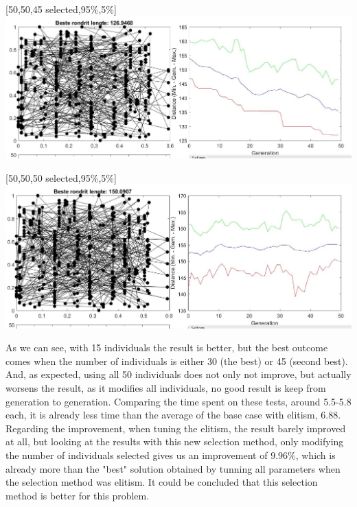 \begin{center}
[50,50,45 selected,95\%,5\%]\\
\includegraphics[width=15cm]{img/optional/optional_4.jpg}
\end{center}

\begin{center}
[50,50,50 selected,95\%,5\%]\\
\includegraphics[width=15cm]{img/optional/optional_5.jpg}
\end{center}

As we can see, with 15 individuals the result is better, but the best outcome
comes when the number of individuals is either 30 (the best) or 45 (second
best). And, as expected, using all 50 individuals does not only not improve,
but actually worsens the result, as it modifies all individuals, no good
result is keep from generation to generation. Comparing the time spent on these
tests, around 5.5-5.8 each, it is already less time than the average of the base
case with elitism, 6.88. 
Regarding the improvement, when tuning the elitism, the result barely improved
at all, but looking at the results with this new selection method, only
modifying the number of individuals selected gives us an improvement of 9.96\%,
which is already more than the "best" solution obtained by tunning all
parameters when the selection method was elitism. It could be concluded
that this selection method is better for this problem.\\ 


